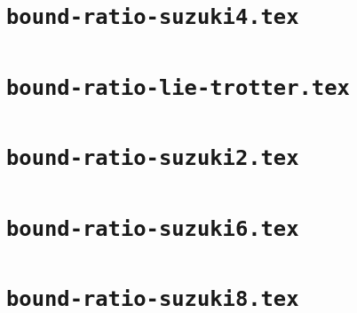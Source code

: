 \documentclass{article}
\begin{document}
\section*{\texttt{bound-ratio-suzuki4.tex}}

\clearpage
\section*{\texttt{bound-ratio-lie-trotter.tex}}

\clearpage
\section*{\texttt{bound-ratio-suzuki2.tex}}

\clearpage
\section*{\texttt{bound-ratio-suzuki6.tex}}

\clearpage
\section*{\texttt{bound-ratio-suzuki8.tex}}

\clearpage
\end{document}

